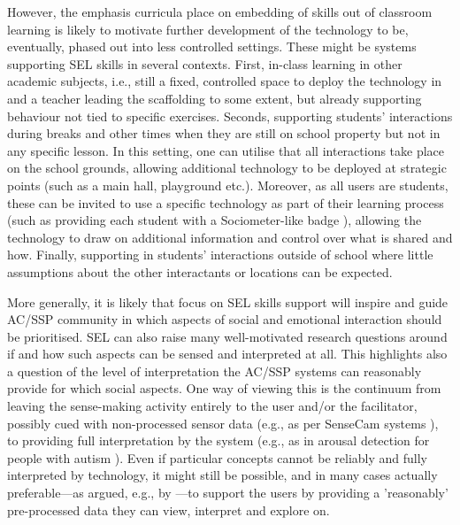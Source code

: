 \documentclass[prodmode,acmtochi]{acmsmall}
\begin{document}
However, the emphasis curricula place on embedding of skills out of classroom learning is likely to motivate further development of the technology to be, eventually, phased out into less controlled settings. These might be systems supporting SEL skills in several contexts. First,  in-class learning in other academic subjects, i.e., still a fixed, controlled space to deploy the technology in and a teacher leading the scaffolding to some extent, but already supporting behaviour not tied to specific exercises. Seconds, supporting students' interactions during breaks and other times when they are still on school property but not in any specific lesson. In this setting, one can utilise that all interactions take place on the school grounds, allowing additional technology to be deployed at strategic points (such as a main hall, playground etc.). Moreover, as all users are students, these can be invited to use a specific technology as part of their learning process (such as providing each student with a Sociometer-like badge \cite{Kim2008}), allowing the technology to draw on additional information and control over what is shared and how. Finally, supporting in students' interactions outside of school where little assumptions about the other interactants or locations can be expected.

More generally, it is likely that focus on SEL skills support will inspire and guide AC/SSP community in which aspects of social and emotional interaction should be prioritised. SEL can also raise many well-motivated research questions around if and how such aspects can be sensed and interpreted at all.
This highlights also a question of the level of interpretation the AC/SSP systems can reasonably provide for which social aspects. One way of viewing this is the continuum from leaving the sense-making activity entirely to the user and/or the facilitator, possibly cued with non-processed sensor data (e.g., as per SenseCam systems \cite{Fleck2009}), to providing full interpretation by the system (e.g., as in arousal detection for people with autism \cite{Picard2009}). Even if particular concepts cannot be reliably and fully interpreted by technology, it might still be possible, and in many cases actually preferable---as argued, e.g., by \cite{Boehner2005,Mentis2014}---to support the users by providing a 'reasonably' pre-processed data they can view, interpret and explore on. 
\end{document}
